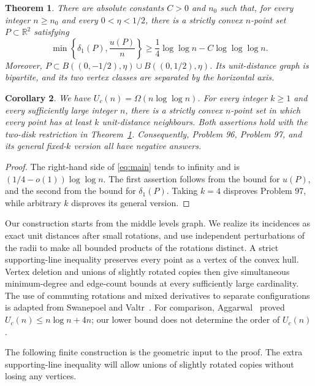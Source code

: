 \documentclass[a4paper,11pt]{amsart}
\newtheorem{theorem}{Theorem}[section]
\newtheorem{corollary}[theorem]{Corollary}
\theoremstyle{remark}
\newcommand{\R}{\mathbb R}
\begin{document}
\begin{theorem}\label{thm:main}
There are absolute constants $C>0$ and $n_0$ such that, for every integer
$n\ge n_0$ and every $0<\eta<1/2$, there is a strictly convex $n$-point set
$P\subset\R^2$ satisfying
\begin{equation}\label{eq:main}
 \min\left\{\delta_1(P),\frac{u(P)}n\right\}
 \ge \frac14\log\log n-C\log\log\log n.
\end{equation}
Moreover,
$P\subset B((0,-1/2),\eta)\cup B((0,1/2),\eta)$.
Its unit-distance graph is bipartite, and its two vertex classes are
separated by the horizontal axis.
\end{theorem}

\begin{corollary}\label{cor:problems}
We have $U_c(n)=\Omega(n\log\log n)$.
For every integer $k\ge1$ and every sufficiently large integer $n$, there
is a strictly convex $n$-point set in which every point has at least $k$
unit-distance neighbours. Both assertions hold with the two-disk
restriction in Theorem~\ref{thm:main}.
Consequently, Problem 96, Problem 97, and its general fixed-$k$ version
all have negative answers.
\end{corollary}

\begin{proof}
The right-hand side of \eqref{eq:main} tends to infinity and is
$(1/4-o(1))\log\log n$. The first assertion follows from the bound for
$u(P)$, and the second from the bound for $\delta_1(P)$.
Taking $k=4$ disproves Problem 97, while arbitrary $k$ disproves its
general version.
\end{proof}

Our construction starts from the middle levels graph. We realize its
incidences as exact unit distances after small rotations, and use
independent perturbations of the radii to make all bounded products of
the rotations distinct. A strict supporting-line inequality preserves
every point as a vertex of the convex hull. Vertex deletion and unions
of slightly rotated copies then give simultaneous minimum-degree and
edge-count bounds at every sufficiently large cardinality. The use of
commuting rotations and mixed derivatives to separate configurations is
adapted from Swanepoel and Valtr~\cite{SV}. For comparison,
Aggarwal~\cite{Aggarwal} proved $U_c(n)\le n\log n+4n$; our lower bound
does not determine the order of $U_c(n)$.

The following finite construction is the geometric input to the proof.
The extra supporting-line inequality will allow unions of slightly
rotated copies without losing any vertices.
\end{document}
